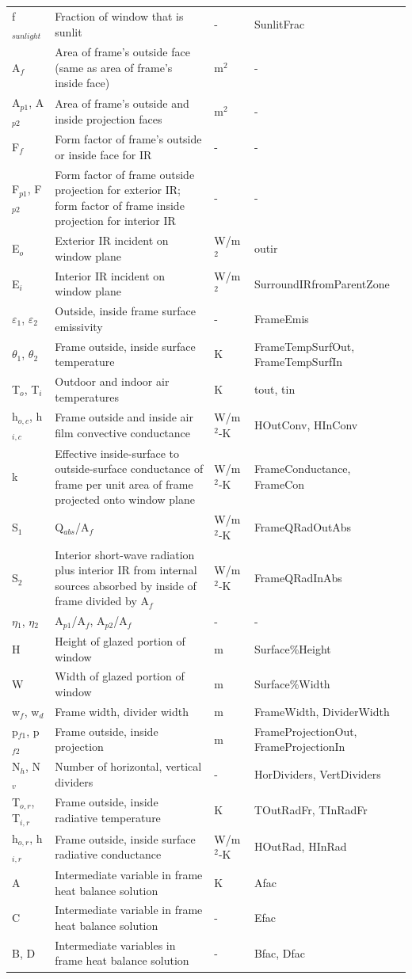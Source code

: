 \begin{longtable}[c]{p{1.0in}p{2.5in}p{1.0in}p{1.5in}}
f\(_{sunlight}\) & Fraction of window that is sunlit & - & SunlitFrac \tabularnewline
A\(_{f}\) & Area of frame’s outside face (same as area of frame’s inside face) & m\(^{2}\) & - \tabularnewline
A\(_{p1}\), A\(_{p2}\) & Area of frame’s outside and inside projection faces & m\(^{2}\) & - \tabularnewline
F\(_{f}\) & Form factor of frame’s outside or inside face for IR & - & - \tabularnewline
F\(_{p1}\), F\(_{p2}\) & Form factor of frame outside projection for exterior IR; form factor of frame inside projection for interior IR & - & - \tabularnewline
E\(_{o}\) & Exterior IR incident on window plane & W/m\(^{2}\) & outir \tabularnewline
E\(_{i}\) & Interior IR incident on window plane & W/m\(^{2}\) & SurroundIRfromParentZone \tabularnewline
$\varepsilon$\(_{1}\), $\varepsilon$\(_{2}\) & Outside, inside frame surface emissivity & - & FrameEmis \tabularnewline
$\theta$\(_{1}\), $\theta$\(_{2}\) & Frame outside, inside surface temperature & K & FrameTempSurfOut, FrameTempSurfIn \tabularnewline
T\(_{o}\), T\(_{i}\) & Outdoor and indoor air temperatures & K & tout, tin \tabularnewline
h\(_{o,c}\), h\(_{i,c}\) & Frame outside and inside air film convective conductance & W/m\(^{2}\)-K & HOutConv, HInConv \tabularnewline
k & Effective inside-surface to outside-surface conductance of frame per unit area of frame projected onto window plane & W/m\(^{2}\)-K & FrameConductance, FrameCon \tabularnewline
S\(_{1}\) & Q\(_{abs}\)/A\(_{f}\) & W/m\(^{2}\)-K & FrameQRadOutAbs \tabularnewline
S\(_{2}\) & Interior short-wave radiation plus interior IR from internal sources absorbed by inside of frame divided by A\(_{f}\) & W/m\(^{2}\)-K & FrameQRadInAbs \tabularnewline
$\eta$\(_{1}\), $\eta$\(_{2}\) & A\(_{p1}\)/A\(_{f}\), A\(_{p2}\)/A\(_{f}\) & - & - \tabularnewline
H & Height of glazed portion of window & m & Surface\%Height \tabularnewline
W & Width of glazed portion of window & m & Surface\%Width \tabularnewline
w\(_{f}\), w\(_{d}\) & Frame width, divider width & m & FrameWidth, DividerWidth \tabularnewline
p\(_{f1}\), p\(_{f2}\) & Frame outside, inside projection & m & FrameProjectionOut, FrameProjectionIn \tabularnewline
N\(_{h}\), N\(_{v}\) & Number of horizontal, vertical dividers & - & HorDividers, VertDividers \tabularnewline
T\(_{o,r}\), T\(_{i,r}\) & Frame outside, inside radiative temperature & K & TOutRadFr, TInRadFr \tabularnewline
h\(_{o,r}\), h\(_{i,r}\) & Frame outside, inside surface radiative conductance & W/m\(^{2}\)-K & HOutRad, HInRad \tabularnewline
A & Intermediate variable in frame heat balance solution & K & Afac \tabularnewline
C & Intermediate variable in frame heat balance solution & - & Efac \tabularnewline
B, D & Intermediate variables in frame heat balance solution & - & Bfac, Dfac \tabularnewline
\bottomrule
\end{longtable}


